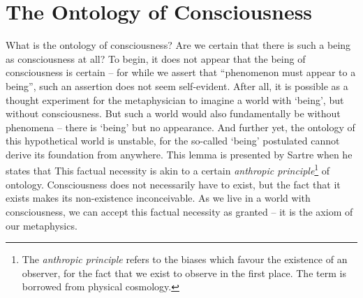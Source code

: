 \section{The Ontology of Consciousness}


What is the ontology of consciousness? 
Are we certain that there is such a being as consciousness at all? To begin, it does not appear that the being of consciousness is certain -- for while we assert that \enquote{phenomenon must appear to a being}, such an assertion does not seem self-evident. After all, it is possible as a thought experiment for the metaphysician to imagine a world with \enquote*{being}, but without consciousness. But such a world would also fundamentally be without phenomena -- there is \enquote*{being} but no appearance. And further yet, the ontology of this hypothetical world is unstable, for the so-called \enquote*{being} postulated cannot derive its foundation from anywhere. This lemma is presented by Sartre when he states that  This factual necessity is akin to a certain \emph{anthropic principle}\footnote{The \emph{anthropic principle} refers to the biases which favour the existence of an observer, for the fact that we exist to observe in the first place. The term is borrowed from physical cosmology.} of ontology. Consciousness does not necessarily have to exist, but the fact that it exists makes its non-existence inconceivable. As we live in a world with consciousness, we can accept this factual necessity as granted -- it is the axiom of our metaphysics. 

